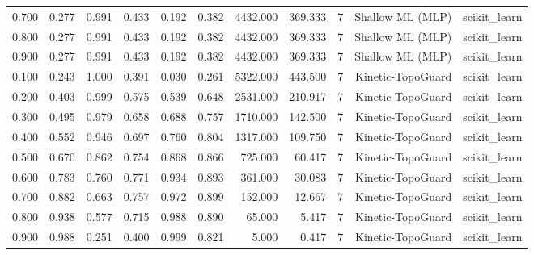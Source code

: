 \begin{tabular}{lrrrrrrrrrr}
0.700 & 0.277 & 0.991 & 0.433 & 0.192 & 0.382 & 4432.000 & 369.333 & 7 & Shallow ML (MLP) & scikit\_learn \\
0.800 & 0.277 & 0.991 & 0.433 & 0.192 & 0.382 & 4432.000 & 369.333 & 7 & Shallow ML (MLP) & scikit\_learn \\
0.900 & 0.277 & 0.991 & 0.433 & 0.192 & 0.382 & 4432.000 & 369.333 & 7 & Shallow ML (MLP) & scikit\_learn \\
0.100 & 0.243 & 1.000 & 0.391 & 0.030 & 0.261 & 5322.000 & 443.500 & 7 & Kinetic-TopoGuard & scikit\_learn \\
0.200 & 0.403 & 0.999 & 0.575 & 0.539 & 0.648 & 2531.000 & 210.917 & 7 & Kinetic-TopoGuard & scikit\_learn \\
0.300 & 0.495 & 0.979 & 0.658 & 0.688 & 0.757 & 1710.000 & 142.500 & 7 & Kinetic-TopoGuard & scikit\_learn \\
0.400 & 0.552 & 0.946 & 0.697 & 0.760 & 0.804 & 1317.000 & 109.750 & 7 & Kinetic-TopoGuard & scikit\_learn \\
0.500 & 0.670 & 0.862 & 0.754 & 0.868 & 0.866 & 725.000 & 60.417 & 7 & Kinetic-TopoGuard & scikit\_learn \\
0.600 & 0.783 & 0.760 & 0.771 & 0.934 & 0.893 & 361.000 & 30.083 & 7 & Kinetic-TopoGuard & scikit\_learn \\
0.700 & 0.882 & 0.663 & 0.757 & 0.972 & 0.899 & 152.000 & 12.667 & 7 & Kinetic-TopoGuard & scikit\_learn \\
0.800 & 0.938 & 0.577 & 0.715 & 0.988 & 0.890 & 65.000 & 5.417 & 7 & Kinetic-TopoGuard & scikit\_learn \\
0.900 & 0.988 & 0.251 & 0.400 & 0.999 & 0.821 & 5.000 & 0.417 & 7 & Kinetic-TopoGuard & scikit\_learn \\
\bottomrule
\end{tabular}